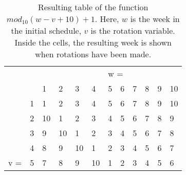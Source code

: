 \begin{table}[H]
\centering
\caption{Resulting table of the function $mod_{10}(w-v+10)+1$. Here, $w$ is the week in the initial schedule, $v$ is the rotation variable. Inside the cells, the resulting week is shown when rotations have been made.}
\label{tab:mod}
\begin{tabular}{llllllllllll}
    &                         &                         &                         &                         &                         & \multicolumn{2}{l}{w =}                           &                         &                         &                         &                         \\
    &                         & 1                       & 2                       & 3                       & 4                       & 5                       & 6                       & 7                       & 8                       & 9                       & 10                      \\ \cline{3-12} 
    & \multicolumn{1}{l|}{1}  & \multicolumn{1}{l|}{1}  & \multicolumn{1}{l|}{2}  & \multicolumn{1}{l|}{3}  & \multicolumn{1}{l|}{4}  & \multicolumn{1}{l|}{5}  & \multicolumn{1}{l|}{6}  & \multicolumn{1}{l|}{7}  & \multicolumn{1}{l|}{8}  & \multicolumn{1}{l|}{9}  & \multicolumn{1}{l|}{10} \\ \cline{3-12} 
    & \multicolumn{1}{l|}{2}  & \multicolumn{1}{l|}{10} & \multicolumn{1}{l|}{1}  & \multicolumn{1}{l|}{2}  & \multicolumn{1}{l|}{3}  & \multicolumn{1}{l|}{4}  & \multicolumn{1}{l|}{5}  & \multicolumn{1}{l|}{6}  & \multicolumn{1}{l|}{7}  & \multicolumn{1}{l|}{8}  & \multicolumn{1}{l|}{9}  \\ \cline{3-12} 
    & \multicolumn{1}{l|}{3}  & \multicolumn{1}{l|}{9}  & \multicolumn{1}{l|}{10} & \multicolumn{1}{l|}{1}  & \multicolumn{1}{l|}{2}  & \multicolumn{1}{l|}{3}  & \multicolumn{1}{l|}{4}  & \multicolumn{1}{l|}{5}  & \multicolumn{1}{l|}{6}  & \multicolumn{1}{l|}{7}  & \multicolumn{1}{l|}{8}  \\ \cline{3-12} 
    & \multicolumn{1}{l|}{4}  & \multicolumn{1}{l|}{8}  & \multicolumn{1}{l|}{9}  & \multicolumn{1}{l|}{10} & \multicolumn{1}{l|}{1}  & \multicolumn{1}{l|}{2}  & \multicolumn{1}{l|}{3}  & \multicolumn{1}{l|}{4}  & \multicolumn{1}{l|}{5}  & \multicolumn{1}{l|}{6}  & \multicolumn{1}{l|}{7}  \\ \cline{3-12} 
v = & \multicolumn{1}{l|}{5}  & \multicolumn{1}{l|}{7}  & \multicolumn{1}{l|}{8}  & \multicolumn{1}{l|}{9}  & \multicolumn{1}{l|}{10} & \multicolumn{1}{l|}{1}  & \multicolumn{1}{l|}{2}  & \multicolumn{1}{l|}{3}  & \multicolumn{1}{l|}{4}  & \multicolumn{1}{l|}{5}  & \multicolumn{1}{l|}{6}  \\ \cline{3-12} 

\end{tabular}
\end{table}
